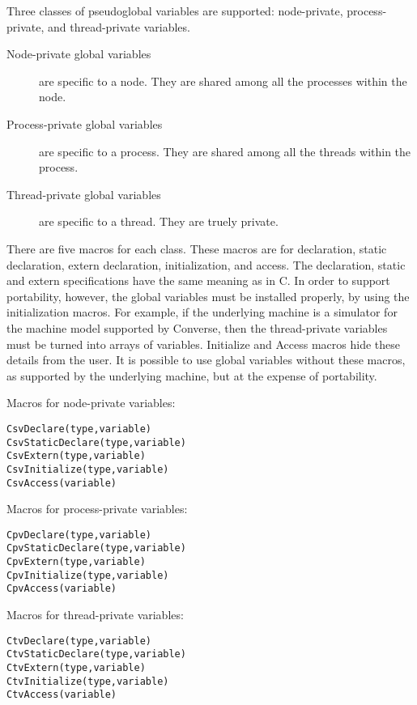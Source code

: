 Three classes of pseudoglobal variables are supported: node-private,
process-private, and thread-private variables.

\begin{description}
\item[Node-private global variables] are specific to a node. They are
     shared among all the processes within the node.
\item[Process-private global variables]  are specific to a process. They are
     shared among all the threads within the process.
\item[Thread-private global variables] are specific to a thread. They are 
     truely private.
\end{description}

There are five macros for each class. These macros are for
declaration, static declaration, extern declaration, initialization,
and access. The declaration, static and extern specifications have the
same meaning as in C. In order to support portability, however, the
global variables must be installed properly, by using the
initialization macros.  For example, if the underlying machine is a
simulator for the machine model supported by Converse, then the
thread-private variables must be turned into arrays of variables.
Initialize and Access macros hide these details from the user.  It is
possible to use global variables without these macros, as supported by
the underlying machine, but at the expense of portability.

Macros for node-private variables:
\begin{verbatim}
CsvDeclare(type,variable)
CsvStaticDeclare(type,variable)
CsvExtern(type,variable)
CsvInitialize(type,variable)
CsvAccess(variable)
\end{verbatim}


Macros for process-private variables:
\begin{verbatim}
CpvDeclare(type,variable)
CpvStaticDeclare(type,variable)
CpvExtern(type,variable)
CpvInitialize(type,variable)
CpvAccess(variable)
\end{verbatim}

Macros for thread-private variables:
\begin{verbatim}
CtvDeclare(type,variable)
CtvStaticDeclare(type,variable)
CtvExtern(type,variable)
CtvInitialize(type,variable)
CtvAccess(variable)
\end{verbatim}



